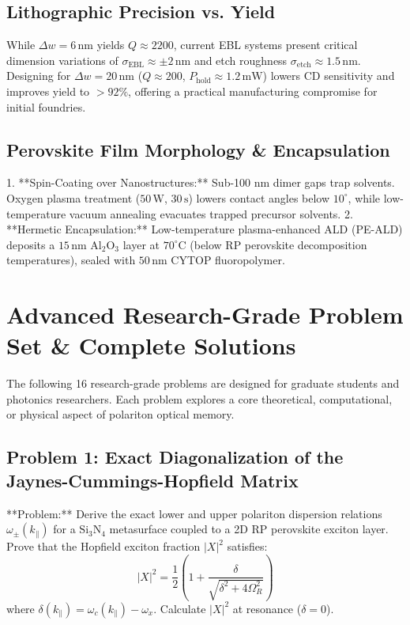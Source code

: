 \documentclass[11pt,oneside]{article}
\begin{document}
\subsection{Lithographic Precision vs. Yield}

While $\Delta w = 6\,\text{nm}$ yields $Q \approx 2200$, current EBL systems present critical dimension variations of $\sigma_{\text{EBL}} \approx \pm 2\,\text{nm}$ and etch roughness $\sigma_{\text{etch}} \approx 1.5\,\text{nm}$. 
Designing for $\Delta w = 20\,\text{nm}$ ($Q \approx 200$, $P_{\text{hold}} \approx 1.2\,\text{mW}$) lowers CD sensitivity and improves yield to $> 92\%$, offering a practical manufacturing compromise for initial foundries.

\subsection{Perovskite Film Morphology \& Encapsulation}

1. **Spin-Coating over Nanostructures:** Sub-100 nm dimer gaps trap solvents. Oxygen plasma treatment ($50\,\text{W}$, $30\,\text{s}$) lowers contact angles below $10^\circ$, while low-temperature vacuum annealing evacuates trapped precursor solvents.
2. **Hermetic Encapsulation:** Low-temperature plasma-enhanced ALD (PE-ALD) deposits a $15\,\text{nm}$ $\text{Al}_2\text{O}_3$ layer at $70^\circ\text{C}$ (below RP perovskite decomposition temperatures), sealed with $50\,\text{nm}$ CYTOP fluoropolymer.

\section{Advanced Research-Grade Problem Set \& Complete Solutions}
\label{sec:advanced_problems}

The following 16 research-grade problems are designed for graduate students and photonics researchers. Each problem explores a core theoretical, computational, or physical aspect of polariton optical memory.



\subsection{Problem 1: Exact Diagonalization of the Jaynes-Cummings-Hopfield Matrix}
\begin{problembox}
**Problem:** Derive the exact lower and upper polariton dispersion relations $\omega_\pm(k_\parallel)$ for a $\text{Si}_3\text{N}_4$ metasurface coupled to a 2D RP perovskite exciton layer. Prove that the Hopfield exciton fraction $|X|^2$ satisfies:
\begin{equation}
|X|^2 = \frac{1}{2} \left( 1 + \frac{\delta}{\sqrt{\delta^2 + 4\Omega_R^2}} \right)
\end{equation}
where $\delta(k_\parallel) = \omega_c(k_\parallel) - \omega_x$. Calculate $|X|^2$ at resonance ($\delta = 0$).
\end{problembox}
\end{document}
